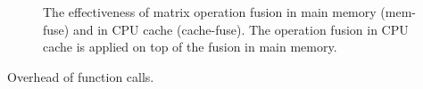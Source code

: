 \begin{figure}
	\begin{center}
		\footnotesize
		
		\caption{The effectiveness of matrix operation fusion in main memory
			(mem-fuse) and in CPU cache (cache-fuse). The operation fusion in
		CPU cache is applied on top of the fusion in main memory.}
		\label{perf:mem_move}
	\end{center}
\end{figure}

Overhead of function calls.
